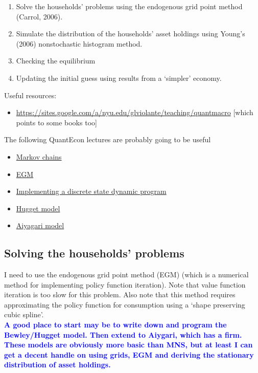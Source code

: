 \documentclass[12pt]{article}
\begin{document}
\begin{enumerate}
\item Solve the households' problems using the endogenous grid point method (Carrol, 2006).
\item Simulate the distribution of the households' asset holdings using Young's (2006) nonstochastic histogram method.
\item Checking the equilibrium
\item Updating the initial guess using results from a `simpler' economy.
\end{enumerate}



Useful resources:
\begin{itemize}
\item \url{https://sites.google.com/a/nyu.edu/glviolante/teaching/quantmacro} [which points to some books too]
\end{itemize}
The following QuantEcon lectures are probably going to be useful
\begin{itemize}
\item \href{https://lectures.quantecon.org/jl/finite_markov.html}{Markov chains}
\item \href{https://lectures.quantecon.org/jl/egm_policy_iter.html}{EGM}
\item \href{https://lectures.quantecon.org/jl/discrete_dp.html}{Implementing a discrete state dynamic program}
\item \href{https://lectures.quantecon.org/jl/ifp.html}{Hugget model}
\item \href{https://lectures.quantecon.org/jl/aiyagari.html}{Aiyagari model}
\end{itemize}


\subsection{Solving the households' problems}
I need to use the endogenous grid point method (EGM) (which is a numerical method for implementing policy function iteration). Note that value function iteration is too slow for this problem. Also note that this method requires approximating the policy function for consumption using a `shape preserving cubic spline'.\\

\textbf{\textcolor{blue}{A good place to start may be to write down and program the Bewley/Hugget model. Then extend to Aiygari, which has a firm. These models are obviously more basic than MNS, but at least I can get a decent handle on using grids, EGM and deriving the stationary distribution of asset holdings.}}
\end{document}
